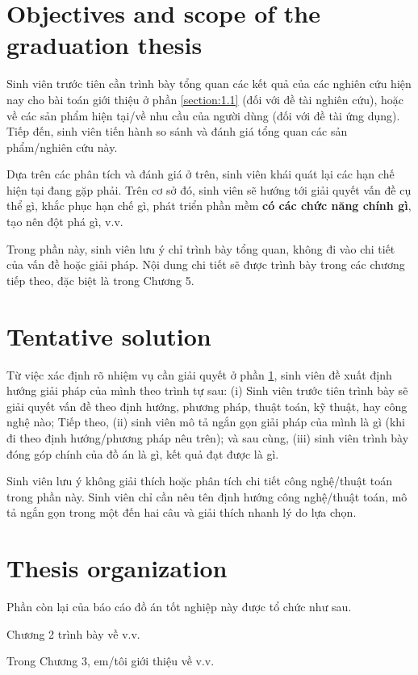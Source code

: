 \documentclass[../Main.tex]{subfiles}
\begin{document}
\section{Objectives and scope of the graduation thesis}
\label{section:1.2}
Sinh viên trước tiên cần trình bày tổng quan các kết quả của các nghiên cứu hiện nay cho bài toán giới thiệu ở phần \ref{section:1.1} (đối với đề tài nghiên cứu), hoặc về các sản phẩm hiện tại/về nhu cầu của người dùng (đối với đề tài ứng dụng).
Tiếp đến, sinh viên tiến hành so sánh và đánh giá tổng quan các sản phẩm/nghiên cứu này.

Dựa trên các phân tích và đánh giá ở trên, sinh viên khái quát lại các hạn chế hiện tại đang gặp phải.
Trên cơ sở đó, sinh viên sẽ hướng tới giải quyết vấn đề cụ thể gì, khắc phục hạn chế gì, phát triển phần mềm \textbf{có các chức năng chính gì}, tạo nên đột phá gì, v.v.

Trong phần này, sinh viên lưu ý chỉ trình bày tổng quan, không đi vào chi tiết của vấn đề hoặc giải pháp.
Nội dung chi tiết sẽ được trình bày trong các chương tiếp theo, đặc biệt là trong Chương 5.

\section{Tentative solution}
\label{section:1.3}
Từ việc xác định rõ nhiệm vụ cần giải quyết ở phần \ref{section:1.2}, sinh viên đề xuất định hướng giải pháp của mình theo trình tự sau: (i) Sinh viên trước tiên trình bày sẽ giải quyết vấn đề theo định hướng, phương pháp, thuật toán, kỹ thuật, hay công nghệ nào; Tiếp theo, (ii) sinh viên mô tả ngắn gọn giải pháp của mình là gì (khi đi theo định hướng/phương pháp nêu trên); và sau cùng, (iii) sinh viên trình bày đóng góp chính của đồ án là gì, kết quả đạt được là gì.

Sinh viên lưu ý không giải thích hoặc phân tích chi tiết công nghệ/thuật toán trong phần này.
Sinh viên chỉ cần nêu tên định hướng công nghệ/thuật toán, mô tả ngắn gọn trong một đến hai câu và giải thích nhanh lý do lựa chọn.

\section{Thesis organization}
\label{section:1.4}
Phần còn lại của báo cáo đồ án tốt nghiệp này được tổ chức như sau.

Chương 2 trình bày về v.v.

Trong Chương 3, em/tôi giới thiệu về v.v.
\end{document}
